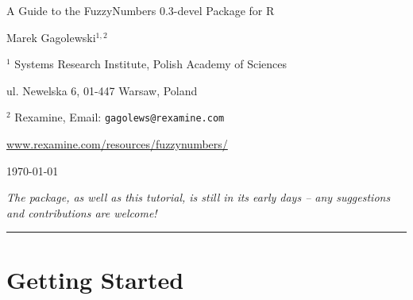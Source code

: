 \documentclass[11pt]{article}\usepackage{graphicx, color}
\newcommand{\hlnumber}[1]{\textcolor[rgb]{0,0,0}{#1}}%
\newcommand{\hlfunctioncall}[1]{\textcolor[rgb]{0.501960784313725,0,0.329411764705882}{\textbf{#1}}}%
\newcommand{\hlstring}[1]{\textcolor[rgb]{0.6,0.6,1}{#1}}%
\newcommand{\hlkeyword}[1]{\textcolor[rgb]{0,0,0}{\textbf{#1}}}%
\newcommand{\hlargument}[1]{\textcolor[rgb]{0.690196078431373,0.250980392156863,0.0196078431372549}{#1}}%
\newcommand{\hlcomment}[1]{\textcolor[rgb]{0.180392156862745,0.6,0.341176470588235}{#1}}%
\newcommand{\hlroxygencomment}[1]{\textcolor[rgb]{0.43921568627451,0.47843137254902,0.701960784313725}{#1}}%
\newcommand{\hlformalargs}[1]{\textcolor[rgb]{0.690196078431373,0.250980392156863,0.0196078431372549}{#1}}%
\newcommand{\hleqformalargs}[1]{\textcolor[rgb]{0.690196078431373,0.250980392156863,0.0196078431372549}{#1}}%
\newcommand{\hlassignement}[1]{\textcolor[rgb]{0,0,0}{\textbf{#1}}}%
\newcommand{\hlpackage}[1]{\textcolor[rgb]{0.588235294117647,0.709803921568627,0.145098039215686}{#1}}%
\newcommand{\hlslot}[1]{\textit{#1}}%
\newcommand{\hlsymbol}[1]{\textcolor[rgb]{0,0,0}{#1}}%
\newcommand{\hlprompt}[1]{\textcolor[rgb]{0.2,0.2,0.2}{#1}}%
\newcommand{\package}[1]{\textsf{#1}\xspace}
\newcommand{\lang}[1]{\textsf{#1}\xspace}
\newcommand{\R}{\lang{R}}
\begin{document}
\begin{center}
{\LARGE\sf A Guide to the \package{FuzzyNumbers} {0.3-devel} Package for \R}

\bigskip
{\large Marek Gagolewski${}^{1,2}$}

${}^{1}$ Systems Research Institute, Polish Academy of Sciences

ul. Newelska 6, 01-447 Warsaw, Poland

${}^{2}$ Rexamine, Email: \texttt{gagolews@rexamine.com}

\href{http://www.rexamine.com/resources/fuzzynumbers/}%
{www.rexamine.com/resources/fuzzynumbers/}

\bigskip
\today



\medskip
\textit{The package, as well as this tutorial, is still in its early
days -- any suggestions and contributions are welcome!}
\end{center}





\bigskip\hrule\bigskip
\tableofcontents









\section{Getting Started}
\end{document}
